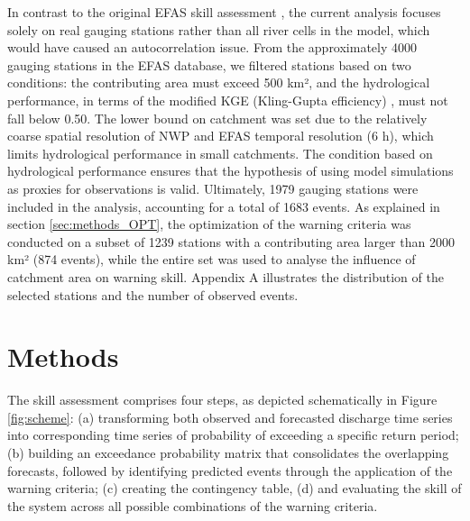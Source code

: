 \documentclass{ametsocV6.1}
\begin{document}
In contrast to the original EFAS skill assessment \citep{Bartholmes2009}, the current analysis focuses solely on real gauging stations rather than all river cells in the model, which would have caused an autocorrelation issue. From the approximately 4000 gauging stations in the EFAS database, we filtered stations based on two conditions: the contributing area must exceed 500 km², and the hydrological performance, in terms of the modified KGE (Kling-Gupta efficiency) \citep{Kling2012, Gupta2009, Knoben2019}, must not fall below 0.50. The lower bound on catchment was set due to the relatively coarse spatial resolution of NWP and EFAS temporal resolution (6 h), which limits hydrological performance in small catchments. The condition based on hydrological performance ensures that the hypothesis of using model simulations as proxies for observations is valid. Ultimately, 1979 gauging stations were included in the analysis, accounting for a total of 1683 events. As explained in section \ref{sec:methods_OPT}, the optimization of the warning criteria was conducted on a subset of 1239 stations with a contributing area larger than 2000 km² (874 events), while the entire set was used to analyse the influence of catchment area on warning skill. Appendix A illustrates the distribution of the selected stations and the number of observed events.

\section{Methods}
\label{sec:methods}

The skill assessment comprises four steps, as depicted schematically in Figure \ref{fig:scheme}: (a) transforming both observed and forecasted discharge time series into corresponding time series of probability of exceeding a specific return period; (b) building an exceedance probability matrix that consolidates the overlapping forecasts, followed by identifying predicted events through the application of the warning criteria; (c) creating the contingency table, (d) and evaluating the skill of the system across all possible combinations of the warning criteria.
\end{document}
